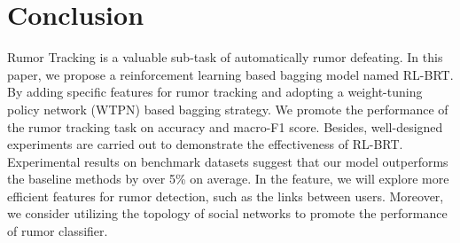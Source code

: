 \section{Conclusion}
\label{sec:conclusion}
Rumor Tracking is a valuable sub-task of automatically rumor defeating. In this paper, we propose a reinforcement learning based bagging model named RL-BRT. By adding specific features for rumor tracking and adopting a weight-tuning policy network (WTPN) based bagging strategy. We promote the performance of the rumor tracking task on accuracy and macro-F1 score. Besides, well-designed experiments are carried out to demonstrate the effectiveness of RL-BRT. Experimental results on benchmark datasets suggest that our model outperforms the baseline methods by over 5\% on average. In the feature, we will explore more efficient features for rumor detection, such as the links between users. Moreover, we consider utilizing the topology of social networks to promote the performance of rumor classifier.